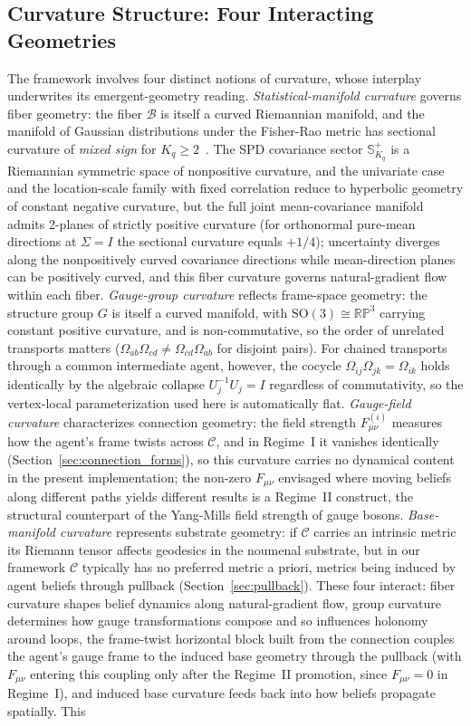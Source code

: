 \documentclass[11pt]{article}
\begin{document}
\subsection{Curvature Structure: Four Interacting Geometries}

The framework involves four distinct notions of curvature, whose interplay underwrites its emergent-geometry reading. \emph{Statistical-manifold curvature} governs fiber geometry: the fiber $\mathcal{B}$ is itself a curved Riemannian manifold, and the manifold of Gaussian distributions under the Fisher-Rao metric has sectional curvature of \emph{mixed sign} for $K_q \geq 2$~\cite{Skovgaard1984}. The SPD covariance sector $\mathbb{S}^+_{K_q}$ is a Riemannian symmetric space of nonpositive curvature, and the univariate case and the location-scale family with fixed correlation reduce to hyperbolic geometry of constant negative curvature, but the full joint mean-covariance manifold admits 2-planes of strictly positive curvature (for orthonormal pure-mean directions at $\Sigma = I$ the sectional curvature equals $+1/4$); uncertainty diverges along the nonpositively curved covariance directions while mean-direction planes can be positively curved, and this fiber curvature governs natural-gradient flow within each fiber. \emph{Gauge-group curvature} reflects frame-space geometry: the structure group $G$ is itself a curved manifold, with $\mathrm{SO}(3) \cong \mathbb{RP}^3$ carrying constant positive curvature, and is non-commutative, so the order of unrelated transports matters ($\Omega_{ab}\Omega_{cd} \neq \Omega_{cd}\Omega_{ab}$ for disjoint pairs). For chained transports through a common intermediate agent, however, the cocycle $\Omega_{ij}\Omega_{jk} = \Omega_{ik}$ holds identically by the algebraic collapse $U_j^{-1}U_j = I$ regardless of commutativity, so the vertex-local parameterization used here is automatically flat. \emph{Gauge-field curvature} characterizes connection geometry: the field strength $F^{(i)}_{\mu\nu}$ measures how the agent's frame twists across $\mathcal{C}$, and in Regime~I it vanishes identically (Section~\ref{sec:connection_forms}), so this curvature carries no dynamical content in the present implementation; the non-zero $F_{\mu\nu}$ envisaged where moving beliefs along different paths yields different results is a Regime~II construct, the structural counterpart of the Yang-Mills field strength of gauge bosons. \emph{Base-manifold curvature} represents substrate geometry: if $\mathcal{C}$ carries an intrinsic metric its Riemann tensor affects geodesics in the noumenal substrate, but in our framework $\mathcal{C}$ typically has no preferred metric a priori, metrics being induced by agent beliefs through pullback (Section~\ref{sec:pullback}). These four interact: fiber curvature shapes belief dynamics along natural-gradient flow, group curvature determines how gauge transformations compose and so influences holonomy around loops, the frame-twist horizontal block built from the connection couples the agent's gauge frame to the induced base geometry through the pullback (with $F_{\mu\nu}$ entering this coupling only after the Regime~II promotion, since $F_{\mu\nu} = 0$ in Regime~I), and induced base curvature feeds back into how beliefs propagate spatially. This 
\end{document}
